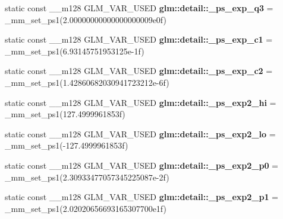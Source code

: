 \begin{DoxyCompactItemize}
\item 
\hypertarget{namespaceglm_1_1detail_a82e835d121ac93c163a6a7a1190cdfc9}{}static const \+\_\+\+\_\+m128 G\+L\+M\+\_\+\+V\+A\+R\+\_\+\+U\+S\+E\+D {\bfseries glm\+::detail\+::\+\_\+ps\+\_\+exp\+\_\+q3} = \+\_\+mm\+\_\+set\+\_\+ps1(2.\+00000000000000000009e0f)\label{namespaceglm_1_1detail_a82e835d121ac93c163a6a7a1190cdfc9}

\item 
\hypertarget{namespaceglm_1_1detail_a1e0d0585374e0ee2e2bf790cde1c4781}{}static const \+\_\+\+\_\+m128 G\+L\+M\+\_\+\+V\+A\+R\+\_\+\+U\+S\+E\+D {\bfseries glm\+::detail\+::\+\_\+ps\+\_\+exp\+\_\+c1} = \+\_\+mm\+\_\+set\+\_\+ps1(6.\+93145751953125e-\/1f)\label{namespaceglm_1_1detail_a1e0d0585374e0ee2e2bf790cde1c4781}

\item 
\hypertarget{namespaceglm_1_1detail_a64637571ab7635d723c92d7b213b26d5}{}static const \+\_\+\+\_\+m128 G\+L\+M\+\_\+\+V\+A\+R\+\_\+\+U\+S\+E\+D {\bfseries glm\+::detail\+::\+\_\+ps\+\_\+exp\+\_\+c2} = \+\_\+mm\+\_\+set\+\_\+ps1(1.\+42860682030941723212e-\/6f)\label{namespaceglm_1_1detail_a64637571ab7635d723c92d7b213b26d5}

\item 
\hypertarget{namespaceglm_1_1detail_a7ac8a127529b4ff484d00f7cf3a42ef4}{}static const \+\_\+\+\_\+m128 G\+L\+M\+\_\+\+V\+A\+R\+\_\+\+U\+S\+E\+D {\bfseries glm\+::detail\+::\+\_\+ps\+\_\+exp2\+\_\+hi} = \+\_\+mm\+\_\+set\+\_\+ps1(127.\+4999961853f)\label{namespaceglm_1_1detail_a7ac8a127529b4ff484d00f7cf3a42ef4}

\item 
\hypertarget{namespaceglm_1_1detail_ae49b11f56eb1329bf922d8dc78a64c92}{}static const \+\_\+\+\_\+m128 G\+L\+M\+\_\+\+V\+A\+R\+\_\+\+U\+S\+E\+D {\bfseries glm\+::detail\+::\+\_\+ps\+\_\+exp2\+\_\+lo} = \+\_\+mm\+\_\+set\+\_\+ps1(-\/127.\+4999961853f)\label{namespaceglm_1_1detail_ae49b11f56eb1329bf922d8dc78a64c92}

\item 
\hypertarget{namespaceglm_1_1detail_a00667e2d9407e598f3f0e3d5f8c54924}{}static const \+\_\+\+\_\+m128 G\+L\+M\+\_\+\+V\+A\+R\+\_\+\+U\+S\+E\+D {\bfseries glm\+::detail\+::\+\_\+ps\+\_\+exp2\+\_\+p0} = \+\_\+mm\+\_\+set\+\_\+ps1(2.\+30933477057345225087e-\/2f)\label{namespaceglm_1_1detail_a00667e2d9407e598f3f0e3d5f8c54924}

\item 
\hypertarget{namespaceglm_1_1detail_a924c2a780a581922933ea62e579bc6a1}{}static const \+\_\+\+\_\+m128 G\+L\+M\+\_\+\+V\+A\+R\+\_\+\+U\+S\+E\+D {\bfseries glm\+::detail\+::\+\_\+ps\+\_\+exp2\+\_\+p1} = \+\_\+mm\+\_\+set\+\_\+ps1(2.\+02020656693165307700e1f)\label{namespaceglm_1_1detail_a924c2a780a581922933ea62e579bc6a1}


\end{DoxyCompactItemize}
